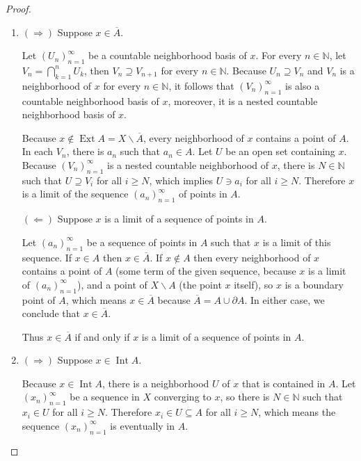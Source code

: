 \begin{proof}
	\begin{enumerate}[label={(\alph*)}]
		\item $(\Rightarrow)$ Suppose $x\in \overline{A}$.

		      Let ${(U_{n})}^{\infty}_{n=1}$ be a countable neighborhood basis of $x$. For every $n\in\mathbb{N}$, let $V_{n} = \bigcap^{n}_{k=1}U_{k}$, then $V_{n}\supseteq V_{n+1}$ for every $n\in\mathbb{N}$. Because $U_{n}\supseteq V_{n}$ and $V_{n}$ is a neighborhood of $x$ for every $n\in\mathbb{N}$, it follows that ${(V_{n})}^{\infty}_{n=1}$ is also a countable neighborhood basis of $x$, moreover, it is a nested countable neighborhood basis of $x$.

		      Because $x\notin\operatorname{Ext}A = X\smallsetminus\overline{A}$, every neighborhood of $x$ contains a point of $A$. In each $V_{n}$, there is $a_{n}$ such that $a_{n}\in A$. Let $U$ be an open set containing $x$. Because ${(V_{n})}^{\infty}_{n=1}$ is a nested countable neighborhood of $x$, there is $N\in\mathbb{N}$ such that $U\supseteq V_{i}$ for all $i\geq N$, which implies $U\ni a_{i}$ for all $i\geq N$. Therefore $x$ is a limit of the sequence ${(a_{n})}^{\infty}_{n=1}$ of points in $A$.

		      $(\Leftarrow)$ Suppose $x$ is a limit of a sequence of points in $A$.

		      Let ${(a_{n})}^{\infty}_{n=1}$ be a sequence of points in $A$ such that $x$ is a limit of this sequence. If $x\in A$ then $x\in\overline{A}$. If $x\notin A$ then every neighborhood of $x$ contains a point of $A$ (some term of the given sequence, because $x$ is a limit of ${(a_{n})}^{\infty}_{n=1}$), and a point of $X\smallsetminus A$ (the point $x$ itself), so $x$ is a boundary point of $A$, which means $x\in\overline{A}$ because $\overline{A} = A\cup\partial A$. In either case, we conclude that $x\in \overline{A}$.

		      Thus $x\in\overline{A}$ if and only if $x$ is a limit of a sequence of points in $A$.
		\item $(\Rightarrow)$ Suppose $x\in\operatorname{Int} A$.

		      Because $x\in\operatorname{Int} A$, there is a neighborhood $U$ of $x$ that is contained in $A$. Let ${(x_{n})}^{\infty}_{n=1}$ be a sequence in $X$ converging to $x$, so there is $N\in\mathbb{N}$ such that $x_{i}\in U$ for all $i\geq N$. Therefore $x_{i}\in U\subseteq A$ for all $i\geq N$, which means the sequence ${(x_{n})}^{\infty}_{n=1}$ is eventually in $A$.


\end{enumerate}
\end{proof}
